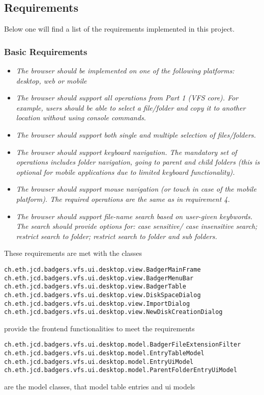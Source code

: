 \subsection{Requirements}
Below one will find a list of the requirements implemented in this project.

\subsubsection {Basic Requirements}
\begin{itemize}
  \item \emph{The browser should be implemented on one of the following
  platforms: desktop, web or mobile}
  \item \emph{The browser should support all operations from Part 1 (VFS core).
  For example, users should be able to select a file/folder and copy it to
  another location without using console commands. }
  \item \emph{The browser should support both single and multiple selection of
  files/folders.}
  \item \emph{The browser should support keyboard navigation. The mandatory set of operations includes folder
  navigation, going to parent and child folders (this is optional for mobile applications due to limited
  keyboard functionality).}
  \item \emph{The browser should support mouse navigation (or touch in case of the mobile platform). The
  required operations are the same as in requirement 4.}
  \item \emph{The browser should support file-name search based on user-given
  keybwords. The search should provide options for: case sensitive/ case
  insensitive search; restrict search to folder; restrict search to folder and sub folders.}
\end{itemize}  These requirements are met with the classes
\begin{verbatim}
ch.eth.jcd.badgers.vfs.ui.desktop.view.BadgerMainFrame
ch.eth.jcd.badgers.vfs.ui.desktop.view.BadgerMenuBar
ch.eth.jcd.badgers.vfs.ui.desktop.view.BadgerTable
ch.eth.jcd.badgers.vfs.ui.desktop.view.DiskSpaceDialog
ch.eth.jcd.badgers.vfs.ui.desktop.view.ImportDialog
ch.eth.jcd.badgers.vfs.ui.desktop.view.NewDiskCreationDialog
\end{verbatim} provide the frontend functionalities to meet the requirements

\begin{verbatim}
ch.eth.jcd.badgers.vfs.ui.desktop.model.BadgerFileExtensionFilter
ch.eth.jcd.badgers.vfs.ui.desktop.model.EntryTableModel
ch.eth.jcd.badgers.vfs.ui.desktop.model.EntryUiModel
ch.eth.jcd.badgers.vfs.ui.desktop.model.ParentFolderEntryUiModel
\end{verbatim} are the model classes, that model table entries and ui models

